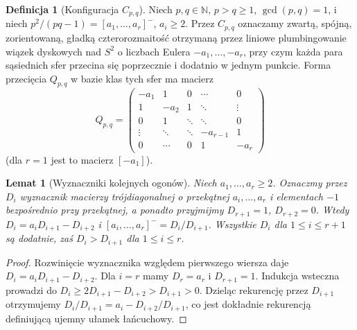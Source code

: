 \documentclass[11pt,a4paper]{report}
\numberwithin{equation}{section}
\theoremstyle{plain}
\newtheorem{lemat}[twierdzenie]{Lemat}
\theoremstyle{definition}
\newtheorem{definicja}[twierdzenie]{Definicja}
\theoremstyle{remark}
\begin{document}
\begin{definicja}[Konfiguracja $C_{p,q}$]
Niech $p,q\in\mathbb N$, $p>q\geq1$, $\gcd(p,q)=1$, i niech
$p^2/(pq-1)=[a_1,\ldots,a_r]^-$, $a_i\geq2$.
Przez $C_{p,q}$ oznaczamy zwartą, spójną, zorientowaną,
gładką czterorozmaitość otrzymaną przez liniowe plumbingowanie
wiązek dyskowych nad $S^2$ o liczbach Eulera
$-a_1,\ldots,-a_r$, przy czym każda para sąsiednich sfer
przecina się poprzecznie i dodatnio w jednym punkcie.
Forma przecięcia $Q_{p,q}$ w bazie klas tych sfer ma macierz
\[
Q_{p,q}=\begin{pmatrix}
-a_1&1&0&\cdots&0\\
1&-a_2&1&\ddots&\vdots\\
0&1&\ddots&\ddots&0\\
\vdots&\ddots&\ddots&-a_{r-1}&1\\
0&\cdots&0&1&-a_r
\end{pmatrix}
\]
(dla $r=1$ jest to macierz $[-a_1]$).
\end{definicja}

\begin{center}
\end{center}

\begin{lemat}[Wyznaczniki kolejnych ogonów]
\label{lem:tg-general-minors}
Niech $a_1,\ldots,a_r\geq2$. Oznaczmy przez $D_i$ wyznacznik
macierzy trójdiagonalnej o przekątnej
$a_i,\ldots,a_r$ i elementach $-1$ bezpośrednio przy przekątnej,
a ponadto przyjmijmy $D_{r+1}=1$, $D_{r+2}=0$. Wtedy
$D_i=a_iD_{i+1}-D_{i+2}$ i
$[a_i,\ldots,a_r]^-=D_i/D_{i+1}$. Wszystkie $D_i$ dla
$1\leq i\leq r+1$ są dodatnie, zaś $D_i>D_{i+1}$ dla
$1\leq i\leq r$.
\end{lemat}

\begin{proof}
Rozwinięcie wyznacznika względem pierwszego wiersza daje
$D_i=a_iD_{i+1}-D_{i+2}$. Dla $i=r$ mamy $D_r=a_r$ i
$D_{r+1}=1$. Indukcja wsteczna prowadzi do
$D_i\geq2D_{i+1}-D_{i+2}>D_{i+1}>0$.
Dzieląc rekurencję przez $D_{i+1}$ otrzymujemy
$D_i/D_{i+1}=a_i-D_{i+2}/D_{i+1}$, co jest dokładnie
rekurencją definiującą ujemny ułamek łańcuchowy.
\end{proof}
\end{document}
